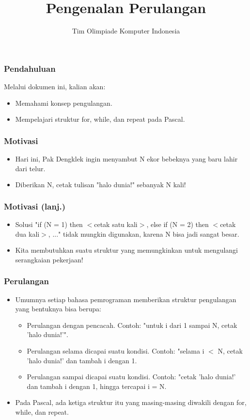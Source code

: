 \documentclass{beamer}
\title{Pengenalan Perulangan}
\author{Tim Olimpiade Komputer Indonesia}
\begin{document}
\begin{frame}
\titlepage
\end{frame}

\begin{frame}
\frametitle{Pendahuluan}
Melalui dokumen ini, kalian akan:
\begin{itemize}
	\item Memahami konsep pengulangan.
	\item Mempelajari struktur for, while, dan repeat pada Pascal.
\end{itemize}
\end{frame}

\begin{frame}
\frametitle{Motivasi}
\begin{itemize}
	\item Hari ini, Pak Dengklek ingin menyambut N ekor bebeknya yang baru lahir dari telur.
	\item Diberikan N, cetak tulisan "halo dunia!" sebanyak N kali!
\end{itemize}
\end{frame}

\begin{frame}
\frametitle{Motivasi (lanj.)}
\begin{itemize}
	\item Solusi "if (N = 1) then $<$cetak satu kali$>$, else if (N = 2) then $<$cetak dua kali$>$, ..." tidak mungkin digunakan, karena N bisa jadi sangat besar.
	\item Kita membutuhkan suatu struktur yang memungkinkan untuk mengulangi serangkaian pekerjaan!
\end{itemize}
\end{frame}

\begin{frame}
\frametitle{Perulangan}
\begin{itemize}
	\item Umumnya setiap bahasa pemrograman memberikan struktur pengulangan yang bentuknya bisa berupa:
	\begin{itemize}
		\item Perulangan dengan pencacah. Contoh: "untuk i dari 1 sampai N, cetak 'halo dunia!'".
		\item Perulangan selama dicapai suatu kondisi. Contoh: "selama i $<$ N, cetak 'halo dunia!' dan tambah i dengan 1.
		\item Perulangan sampai dicapai suatu kondisi. Contoh: "cetak 'halo dunia!' dan tambah i dengan 1, hingga tercapai i = N.
	\end{itemize}
	\item Pada Pascal, ada ketiga struktur itu yang masing-masing diwakili dengan \alert{for}, \alert{while}, dan \alert{repeat}. 
\end{itemize}
\end{frame}
\end{document}
